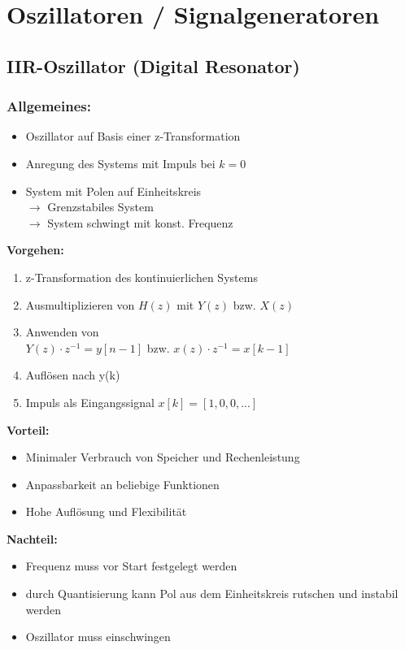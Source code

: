 \documentclass[10pt,a4paper]{article}
\begin{document}
\section{Oszillatoren / Signalgeneratoren}
\subsection{IIR-Oszillator (Digital Resonator)}
\subsubsection{Allgemeines:}
\begin{itemize}
  \item Oszillator auf Basis einer z-Transformation
  \item Anregung des Systems mit Impuls bei $k=0$
  \item System mit Polen auf Einheitskreis\\
  $\rightarrow$ Grenzstabiles System\\
  $\rightarrow$ System schwingt mit konst. Frequenz
\end{itemize}

\textbf{Vorgehen:}
\begin{enumerate}
  \item z-Transformation des kontinuierlichen Systems
  \item Ausmultiplizieren von $H(z)$ mit $Y(z)$ bzw. $X(z)$
  \item Anwenden von \\
  $Y(z)\cdot z^{-1}=y[n-1]$ bzw. $x(z)\cdot z^{-1}=x[k-1]$
  \item Auflösen nach y(k)
  \item Impuls als Eingangssignal $x[k] = [1, 0, 0, ...]$
\end{enumerate}

\textbf{Vorteil:}
\begin{itemize}
  \item Minimaler Verbrauch von Speicher und Rechenleistung
  \item Anpassbarkeit an beliebige Funktionen
  \item Hohe Auflösung und Flexibilität
\end{itemize}  

\textbf{Nachteil:}
\begin{itemize}
  \item Frequenz muss vor Start festgelegt werden
  \item durch Quantisierung kann Pol aus dem Einheitskreis rutschen und instabil werden
  \item Oszillator muss einschwingen
\end{itemize}  
\end{document}
